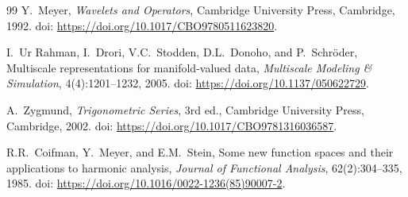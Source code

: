 \documentclass{article}
\theoremstyle{plain}
\theoremstyle{definition}
\begin{document}
\begin{thebibliography}{99}
Y.\ Meyer,
\textit{Wavelets and Operators},
Cambridge University Press, Cambridge, 1992.
doi: \url{https://doi.org/10.1017/CBO9780511623820}.

I.\ Ur Rahman, I.\ Drori, V.C.\ Stodden, D.L.\ Donoho, and P.\ Schr\"{o}der,
Multiscale representations for manifold-valued data,
\textit{Multiscale Modeling \& Simulation}, 4(4):1201--1232, 2005.
doi: \url{https://doi.org/10.1137/050622729}.

A.\ Zygmund,
\textit{Trigonometric Series}, 3rd ed.,
Cambridge University Press, Cambridge, 2002.
doi: \url{https://doi.org/10.1017/CBO9781316036587}.

R.R.\ Coifman, Y.\ Meyer, and E.M.\ Stein,
Some new function spaces and their applications to harmonic analysis,
\textit{Journal of Functional Analysis}, 62(2):304--335, 1985.
doi: \url{https://doi.org/10.1016/0022-1236(85)90007-2}.

\end{thebibliography}
\end{document}
